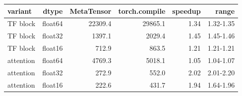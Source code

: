 \begin{tabular}{lrrrrr}
\toprule
variant & dtype & MetaTensor & torch.compile & speedup & range \\
\midrule
TF block & float64 & 22309.4 & 29865.1 & 1.34 & 1.32-1.35 \\
TF block & float32 & 1397.1 & 2029.4 & 1.45 & 1.45-1.46 \\
TF block & float16 & 712.9 & 863.5 & 1.21 & 1.21-1.21 \\
attention & float64 & 4769.3 & 5018.1 & 1.05 & 1.04-1.07 \\
attention & float32 & 272.9 & 552.0 & 2.02 & 2.01-2.20 \\
attention & float16 & 222.6 & 431.7 & 1.94 & 1.64-1.96 \\
\bottomrule
\end{tabular}
